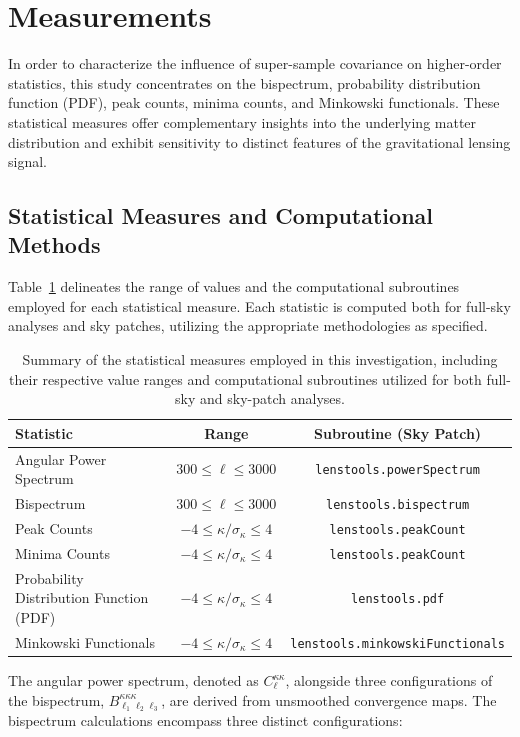 \section{Measurements}
In order to characterize the influence of super-sample covariance on higher-order statistics, this study concentrates on the bispectrum, probability distribution function (PDF), peak counts, minima counts, and Minkowski functionals. These statistical measures offer complementary insights into the underlying matter distribution and exhibit sensitivity to distinct features of the gravitational lensing signal.

\subsection{Statistical Measures and Computational Methods}
Table~\ref{tab:statistics} delineates the range of values and the computational subroutines employed for each statistical measure. Each statistic is computed both for full-sky analyses and sky patches, utilizing the appropriate methodologies as specified.
\begin{table}[htbp]
    \centering
    \begin{tabular}{lcc}
    \toprule
    \textbf{Statistic} & \textbf{Range} & \textbf{Subroutine (Sky Patch)} \\
    \midrule
    Angular Power Spectrum & $300 \leq \ell \leq 3000$ & \texttt{lenstools.powerSpectrum} \\
    Bispectrum & $300 \leq \ell \leq 3000$ & \texttt{lenstools.bispectrum} \\
    Peak Counts & $-4 \leq \kappa/\sigma_\kappa \leq 4$ & \texttt{lenstools.peakCount} \\
    Minima Counts & $-4 \leq \kappa/\sigma_\kappa \leq 4$ & \texttt{lenstools.peakCount} \\
    Probability Distribution Function (PDF) & $-4 \leq \kappa/\sigma_\kappa \leq 4$ & \texttt{lenstools.pdf} \\
    Minkowski Functionals & $-4 \leq \kappa/\sigma_\kappa \leq 4$ & \texttt{lenstools.minkowskiFunctionals} \\
    \bottomrule
    \end{tabular}
    \caption{Summary of the statistical measures employed in this investigation, including their respective value ranges and computational subroutines utilized for both full-sky and sky-patch analyses.}\label{tab:statistics}
\end{table}
The angular power spectrum, denoted as $C_{\ell}^{\kappa\kappa}$, alongside three configurations of the bispectrum, $B_{\ell_1\ell_2\ell_3}^{\kappa\kappa\kappa}$, are derived from unsmoothed convergence maps. The bispectrum calculations encompass three distinct configurations:
